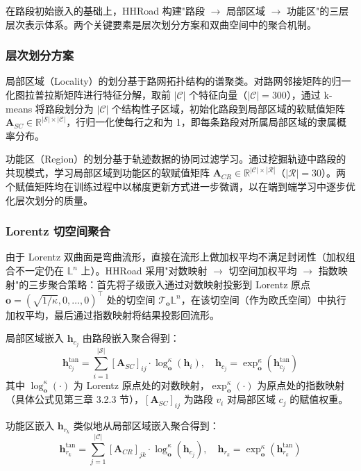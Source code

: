 在路段初始嵌入的基础上，HHRoad 构建"路段 $\to$ 局部区域 $\to$ 功能区"的三层层次表示体系。两个关键要素是层次划分方案和双曲空间中的聚合机制。

\subsubsection{层次划分方案}

局部区域（Locality）的划分基于路网拓扑结构的谱聚类\cite{von2007tutorial}。对路网邻接矩阵的归一化图拉普拉斯矩阵进行特征分解，取前 $|\mathcal{C}|$ 个特征向量（$|\mathcal{C}|=300$），通过 k-means 将路段划分为 $|\mathcal{C}|$ 个结构性子区域，初始化路段到局部区域的软赋值矩阵 $\mathbf{A}_{SC} \in \mathbb{R}^{|\mathcal{S}| \times |\mathcal{C}|}$，行归一化使每行之和为 1，即每条路段对所属局部区域的隶属概率分布。

功能区（Region）的划分基于轨迹数据的协同过滤学习。通过挖掘轨迹中路段的共现模式，学习局部区域到功能区的软赋值矩阵 $\mathbf{A}_{CR} \in \mathbb{R}^{|\mathcal{C}| \times |\mathcal{R}|}$（$|\mathcal{R}|=30$）。两个赋值矩阵均在训练过程中以梯度更新方式进一步微调，以在端到端学习中逐步优化层次划分的质量。

\subsubsection{Lorentz 切空间聚合}

由于 Lorentz 双曲面是弯曲流形，直接在流形上做加权平均不满足封闭性（加权组合不一定仍在 $\mathbb{L}^n$ 上）。HHRoad 采用"对数映射 $\to$ 切空间加权平均 $\to$ 指数映射"的三步聚合策略：首先将子级嵌入通过对数映射投影到 Lorentz 原点 $\mathbf{o} = (\sqrt{1/\kappa}, 0, \ldots, 0)^\top$ 处的切空间 $\mathcal{T}_\mathbf{o}\mathbb{L}^n$，在该切空间（作为欧氏空间）中执行加权平均，最后通过指数映射将结果投影回流形。

局部区域嵌入 $\mathbf{h}_{c_j}$ 由路段嵌入聚合得到：
\begin{equation}
    \mathbf{h}_{c_j}^{\text{tan}} = \sum_{i=1}^{|\mathcal{S}|} [\mathbf{A}_{SC}]_{ij} \cdot \log_{\mathbf{o}}^\kappa(\mathbf{h}_i), \quad \mathbf{h}_{c_j} = \exp_{\mathbf{o}}^\kappa(\mathbf{h}_{c_j}^{\text{tan}})
    \label{eq:locality_agg}
\end{equation}
其中 $\log_{\mathbf{o}}^\kappa(\cdot)$ 为 Lorentz 原点处的对数映射，$\exp_{\mathbf{o}}^\kappa(\cdot)$ 为原点处的指数映射（具体公式见第三章 3.2.3 节），$[\mathbf{A}_{SC}]_{ij}$ 为路段 $v_i$ 对局部区域 $c_j$ 的赋值权重。

功能区嵌入 $\mathbf{h}_{r_k}$ 类似地从局部区域嵌入聚合得到：
\begin{equation}
    \mathbf{h}_{r_k}^{\text{tan}} = \sum_{j=1}^{|\mathcal{C}|} [\mathbf{A}_{CR}]_{jk} \cdot \log_{\mathbf{o}}^\kappa(\mathbf{h}_{c_j}), \quad \mathbf{h}_{r_k} = \exp_{\mathbf{o}}^\kappa(\mathbf{h}_{r_k}^{\text{tan}})
    \label{eq:region_agg}
\end{equation}

